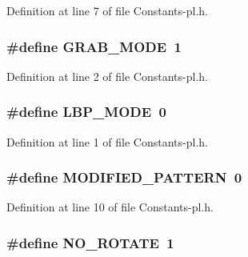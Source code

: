 Definition at line 7 of file Constants-\/pl.\-h.

\hypertarget{_constants-pl_8h_a66425a38b0c7937c73f50847524a3595}{
\subsubsection[{G\-R\-A\-B\-\_\-\-M\-O\-D\-E}]{\setlength{\rightskip}{0pt plus 5cm}\#define G\-R\-A\-B\-\_\-\-M\-O\-D\-E~1}}\label{_constants-pl_8h_a66425a38b0c7937c73f50847524a3595}


Definition at line 2 of file Constants-\/pl.\-h.

\hypertarget{_constants-pl_8h_a6b33b99442f7c7d9e94f003528a86501}{
\subsubsection[{L\-B\-P\-\_\-\-M\-O\-D\-E}]{\setlength{\rightskip}{0pt plus 5cm}\#define L\-B\-P\-\_\-\-M\-O\-D\-E~0}}\label{_constants-pl_8h_a6b33b99442f7c7d9e94f003528a86501}


Definition at line 1 of file Constants-\/pl.\-h.

\hypertarget{_constants-pl_8h_a3d2cac756a32f6fc8a16ea6bf5f7fa64}{
\subsubsection[{M\-O\-D\-I\-F\-I\-E\-D\-\_\-\-P\-A\-T\-T\-E\-R\-N}]{\setlength{\rightskip}{0pt plus 5cm}\#define M\-O\-D\-I\-F\-I\-E\-D\-\_\-\-P\-A\-T\-T\-E\-R\-N~0}}\label{_constants-pl_8h_a3d2cac756a32f6fc8a16ea6bf5f7fa64}


Definition at line 10 of file Constants-\/pl.\-h.

\hypertarget{_constants-pl_8h_ad30aa04d0c2e0be52306deb2c60dff35}{
\subsubsection[{N\-O\-\_\-\-R\-O\-T\-A\-T\-E}]{\setlength{\rightskip}{0pt plus 5cm}\#define N\-O\-\_\-\-R\-O\-T\-A\-T\-E~1}}\label{_constants-pl_8h_ad30aa04d0c2e0be52306deb2c60dff35}


